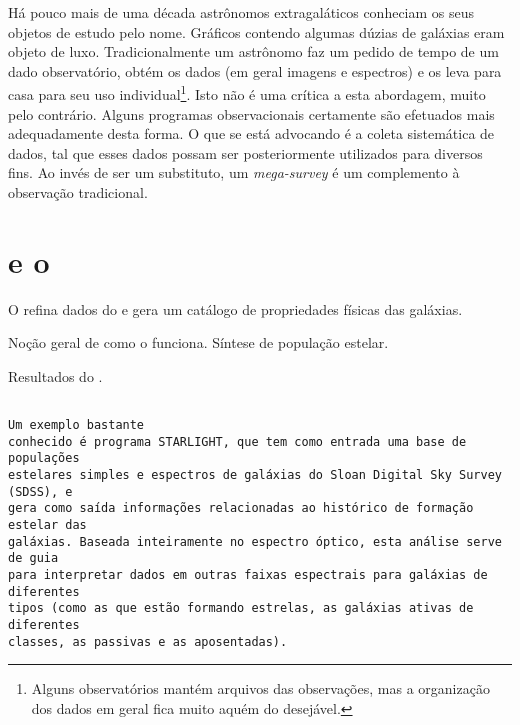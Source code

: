 Há pouco mais de uma década astrônomos extragaláticos conheciam os seus objetos
de estudo pelo nome. Gráficos contendo algumas dúzias de galáxias eram objeto de
luxo. Tradicionalmente um astrônomo faz um pedido de tempo de um dado
observatório, obtém os dados (em geral imagens e espectros) e os leva para casa
para seu uso individual\footnote{Alguns observatórios mantém arquivos das
observações\citneed, mas a organização dos dados em geral fica muito aquém do
desejável.}. Isto não é uma crítica a esta abordagem, muito pelo contrário.
Alguns programas observacionais certamente são efetuados mais adequadamente
desta forma. O que se está advocando é a coleta sistemática de dados, tal que
esses dados possam ser posteriormente utilizados para diversos fins. Ao invés de
ser um substituto, um {\em mega-survey} é um complemento à observação
tradicional.



\section{\starlight e o \SDSS}
\label{sec:Intro:Starlight}


O \starlight refina dados do \SDSS e gera um catálogo de propriedades físicas
das galáxias.

Noção geral de como o \starlight funciona. Síntese de população estelar.

Resultados do \starlight.


\begin{verbatim}

Um exemplo bastante
conhecido é programa STARLIGHT, que tem como entrada uma base de populações
estelares simples e espectros de galáxias do Sloan Digital Sky Survey (SDSS), e
gera como saída informações relacionadas ao histórico de formação estelar das
galáxias. Baseada inteiramente no espectro óptico, esta análise serve de guia
para interpretar dados em outras faixas espectrais para galáxias de diferentes
tipos (como as que estão formando estrelas, as galáxias ativas de diferentes
classes, as passivas e as aposentadas).

\end{verbatim}


